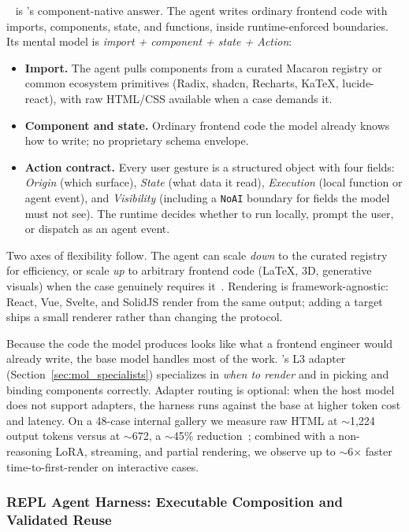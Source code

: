 \uifora{}~\citep{ui4a2026} is \macaron's component-native answer. The agent writes ordinary frontend code with imports, components, state, and functions, inside runtime-enforced boundaries. Its mental model is \emph{import + component + state + Action}:
\begin{itemize}[leftmargin=*]
  \item \textbf{Import.} The agent pulls components from a curated Macaron registry or common ecosystem primitives (Radix, shadcn, Recharts, KaTeX, lucide-react), with raw HTML/CSS available when a case demands it.
  \item \textbf{Component and state.} Ordinary frontend code the model already knows how to write; no proprietary schema envelope.
  \item \textbf{Action contract.} Every user gesture is a structured object with four fields: \emph{Origin} (which surface), \emph{State} (what data it read), \emph{Execution} (local function or agent event), and \emph{Visibility} (including a \verb|NoAI| boundary for fields the model must not see). The runtime decides whether to run locally, prompt the user, or dispatch as an agent event.
\end{itemize}

Two axes of flexibility follow. The agent can scale \emph{down} to the curated registry for efficiency, or scale \emph{up} to arbitrary frontend code (LaTeX, 3D, generative visuals) when the case genuinely requires it~\citep{ui4a2026}. Rendering is framework-agnostic: React, Vue, Svelte, and SolidJS render from the same output; adding a target ships a small renderer rather than changing the protocol.

Because the code the model produces looks like what a frontend engineer would already write, the base model handles most of the work. \venti's L3 adapter (Section~\ref{sec:mol_specialists}) specializes in \emph{when to render} and in picking and binding components correctly. Adapter routing is optional: when the host model does not support adapters, the harness runs against the base at higher token cost and latency. On a 48-case internal gallery we measure raw HTML at \(\sim\)1{,}224 output tokens versus \uifora{} at \(\sim\)672, a \(\sim\)45\% reduction~\citep{ui4a2026}; combined with a non-reasoning LoRA, streaming, and partial rendering, we observe up to \(\sim\)6\(\times\) faster time-to-first-render on interactive cases.

\subsubsection{REPL Agent Harness: Executable Composition and Validated Reuse}
\label{sec:harness_repl}

